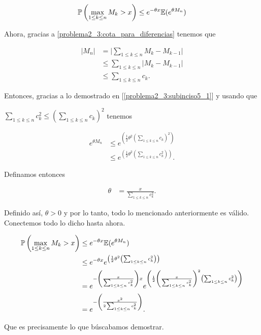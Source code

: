 \begin{align}
    \mathbb{P}\left( \max_{1 \leq k \leq n} M_k > x \right) \leq e^{- \theta x} \mathbb{E}(e^{\theta M_n})
\end{align}\pn

Ahora, gracias a \eqref{problema2_3:cota_para_diferencias} tenemos que

\begin{align}
        |M_n|   &=      \bigg| \sum_{1 \leq k \leq n} M_k - M_{k-1} \bigg|       \\
                &\leq   \sum_{1 \leq k \leq n} \bigg| M_k - M_{k-1} \bigg|       \\
                &\leq   \sum_{1 \leq k \leq n} c_k.                               
\end{align}

Entonces, gracias a lo demostrado en [\ref{problema2_3:subinciso5_1}] y usando que \par$\sum_{1 \leq k \leq n} c_k^2 \leq (\sum_{1 \leq k \leq n} c_k)^2$ tenemos

\begin{align}
    e^{\theta M_n}  &\leq   e^{\left( \frac{1}{2} \theta^2 \left( \sum_{1 \leq k \leq n} c_k \right)^2\right)}  \\
                    &\leq   e^{\left( \frac{1}{2} \theta^2 \left( \sum_{1 \leq k \leq n} c_k^2 \right)\right)}.
\end{align}\pn

Definamos entonces

\begin{align}
    \theta &= \frac{x}{\sum_{1 \leq k \leq n} c_k^2}.
\end{align}\pn

Definido así, $\theta > 0$ y por lo tanto, todo lo mencionado anteriormente es válido. Conectemos todo lo dicho hasta ahora.\pn

\begin{align}
    \mathbb{P}\left( \max_{1 \leq k \leq n} M_k > x \right)    &\leq   e^{- \theta x} \mathbb{E}(e^{\theta M_n})                                                                                                                                                           \\
                                                        &\leq   e^{- \theta x} e^{\left( \frac{1}{2} \theta^2 \left( \sum_{1 \leq k \leq n} c_k^2 \right)\right)}                                                                                           \\
                                                        &=      e^{- \left(\frac{x}{\sum_{1 \leq k \leq n} c_k^2}\right) x} e^{\left( \frac{1}{2} \left(\frac{x}{\sum_{1 \leq k \leq n} c_k^2}\right)^2 \left( \sum_{1 \leq k \leq n} c_k^2 \right)\right)} \\
                                                        &=      e^{- \left(\frac{x^2}{2 \sum_{1 \leq k \leq n} c_k^2}\right)}.
\end{align}\pn

Que es precisamente lo que búscabamos demostrar.

